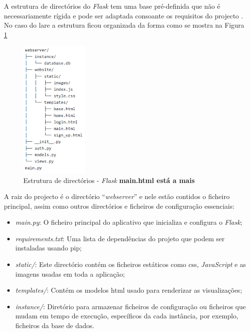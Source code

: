 A estrutura de directórios do \textit{Flask} tem uma base pré-definida que não é necessariamente rígida e pode ser adaptada consoante os requisitos do projecto \cite{Flask}. No caso do \acrshort{lare} a estrutura ficou organizada da forma como se mostra na Figura \ref{fig:estruturapastas}

\begin{figure}[hbtp]
	\centering
	\includegraphics[width=0.3\textwidth]{figures/tree_flask.png}
	\caption{Estrutura de directórios - \textit{Flask} \textbf{ main.html está a mais}}
	\label{fig:estruturapastas}
\end{figure}

A raiz do projecto é o directório ``\textit{webserver}'' e nele estão contidos o ficheiro principal, assim como outros directórios e ficheiros de configuração essenciais:
\begin{itemize}
	\item \textit{main.py}: O ficheiro principal do aplicativo que inicializa e configura o \textit{Flask};
	\item \textit{requirements.txt}: Uma lista de dependências do projeto que podem ser instaladas usando \gls{pip};
	\item \textit{static/}: Este directório contém os ficheiros estáticos como \acrshort{css}, \textit{JavaScript} e as imagens usadas em toda a aplicação;
	\item \textit{templates/}: Contém os modelos \acrshort{html} usado para renderizar as visualizações;
	\item \textit{instance/}: Diretório para armazenar ficheiros de configuração ou ficheiros que mudam em tempo de execução, específicos da cada instância, por exemplo, ficheiros da base de dados.
\end{itemize}

